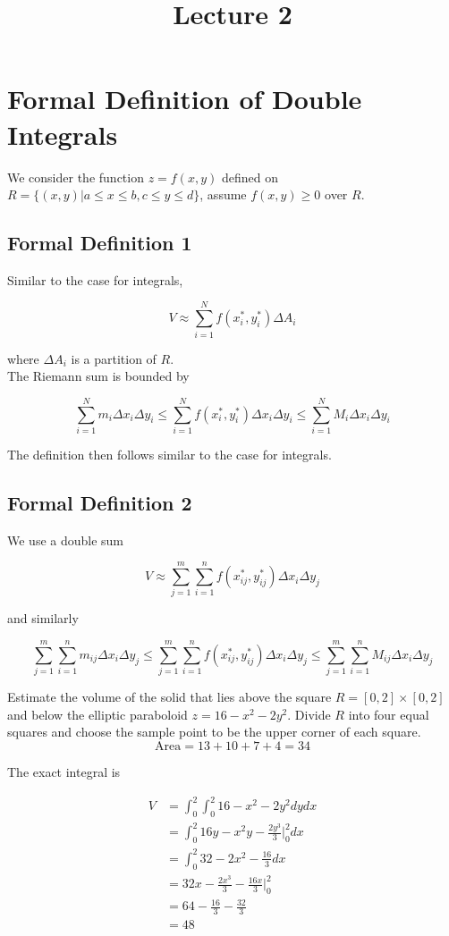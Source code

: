 \documentclass[12pt]{article}
\title{Lecture 2}
\begin{document}
\maketitle

\section{Formal Definition of Double Integrals}
We consider the function $z = f(x,y)$ defined on $R = \{(x,y) | a \leq x \leq b, c \leq y \leq d\}$, assume $f(x,y) \geq 0$ over $R$.
\subsection{Formal Definition 1}

Similar to the case for integrals,

$$V \approx \sum_{i=1}^N f(x_i^*,y_i^*) \Delta A_i$$

where $\Delta A_i$ is a partition of $R$. \\
The Riemann sum is bounded by

$$\sum_{i=1}^N m_i \Delta x_i \Delta y_i \leq \sum_{i=1}^N f(x_i^*, y_i^*) \Delta x_i \Delta y_i \leq \sum_{i=1}^N M_i \Delta x_i \Delta y_i$$

The definition then follows similar to the case for integrals.

\subsection{Formal Definition 2}

We use a double sum

$$V \approx \sum_{j=1}^m \sum_{i=1}^n f(x_{ij}^*, y_{ij}^*) \Delta x_i \Delta y_j$$

and similarly

$$ \sum_{j=1}^m \sum_{i=1}^n m_{ij} \Delta x_i \Delta y_j \leq \sum_{j=1}^m \sum_{i=1}^n f(x_{ij}^*, y_{ij}^*) \Delta x_i \Delta y_j \leq \sum_{j=1}^m \sum_{i=1}^n M_{ij} \Delta x_i \Delta y_j$$

\begin{ex}
 Estimate the volume of the solid that lies above the square $R = [0,2] \times [0,2]$ and below the elliptic paraboloid $z = 16 - x^2 - 2y^2$. Divide $R$ into four equal squares and choose the sample point to be the upper corner of each square. \\
 $$\text{Area} = 13 + 10 + 7 + 4 = 34$$
 
 The exact integral is
 
 
\begin{align*}
 V &= \int_0^2 \int _0^2 16 - x^2 - 2y^2 dydx \\
 &= \int_0^2 16y - x^2y - \frac{2y^3}{3} \Big |_0^2 dx \\
 &= \int_0^2 32 - 2x^2 - \frac{16}{3} dx \\
 &= 32x - \frac{2x^3}{3} - \frac{16x}{3} \Big |_0^2 \\
 &= 64 - \frac{16}{3} - \frac{32}{3} \\
 &= 48 \\
\end{align*}
\end{ex}
\end{document}
